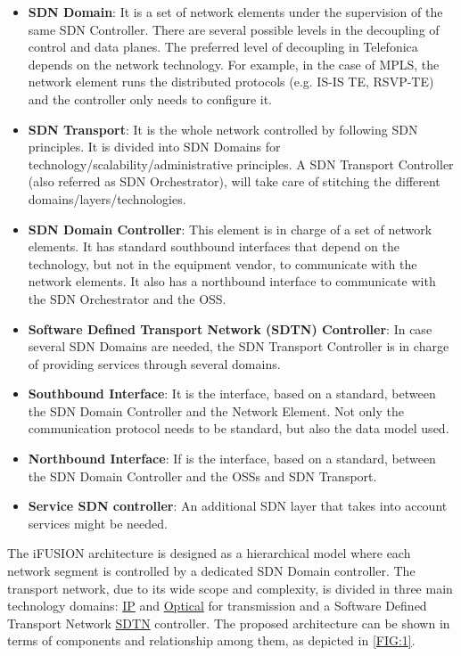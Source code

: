 \documentclass[a4paper,fleqn]{cas-dc}
\begin{document}
\begin{itemize}
\item \textbf{SDN Domain}: It is a set of network elements under the supervision of the same SDN Controller. There are several possible levels in the decoupling of control and data planes. The preferred level of decoupling in Telefonica depends on the network technology. For example, in the case of MPLS, the network element runs the distributed protocols (e.g. IS-IS TE, RSVP-TE) and the controller only needs to configure it.

\item \textbf{SDN Transport}: It is the whole network controlled by following SDN principles. It is divided into SDN Domains for technology/scalability/administrative principles. A SDN Transport Controller (also referred as SDN Orchestrator), will take care of stitching the different domains/layers/technologies.

\item \textbf{SDN Domain Controller}: This element is in charge of a set of network elements. It has standard southbound interfaces that depend on the technology, but not in the equipment vendor, to communicate with the network elements. It also has a northbound interface to communicate with the SDN Orchestrator and the OSS.

\item \textbf{Software Defined Transport Network (SDTN) Controller}: In case several SDN Domains are needed, the SDN Transport Controller is in charge of providing services through several domains. 

\item \textbf{Southbound Interface}: It is the interface, based on a standard, between the SDN Domain Controller and the Network Element. Not only the communication protocol needs to be standard, but also the data model used.

\item \textbf{Northbound Interface}: If is the interface, based on a standard, between the SDN Domain Controller and the OSSs and SDN Transport.

\item \textbf{Service SDN controller}: An additional SDN layer that takes into account services might be needed. 
\end{itemize}

The i\uppercase{FUSION} architecture is designed as a hierarchical model where each network segment is controlled by a dedicated SDN Domain controller. The transport network, due to its wide scope and complexity, is divided in three main technology domains: \hyperref[section:ip]{IP} and \hyperref[section:dwdm]{Optical} for transmission and a Software Defined Transport Network \hyperref[section:sdtn]{SDTN} controller. The proposed architecture can be shown in terms of components and relationship among them, as depicted in \cref{FIG:1}. 
\end{document}
